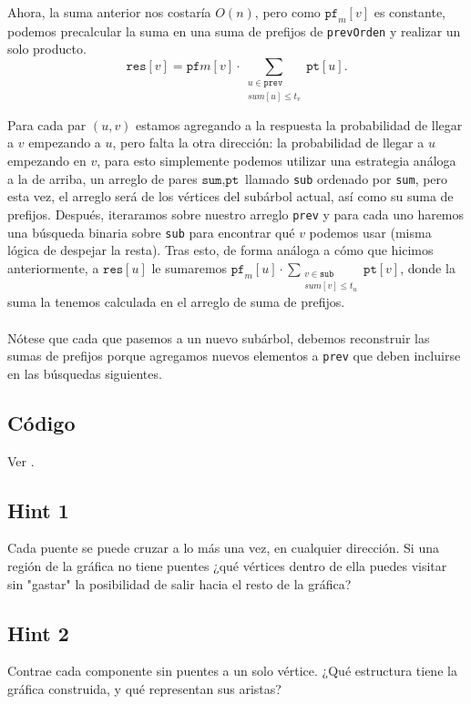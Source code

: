 Ahora, la suma anterior nos costaría $O(n)$, pero como $\texttt{pf}_m[v]$ es constante, podemos precalcular la suma en una suma de prefijos de \texttt{prevOrden} y realizar un solo producto.
\[\texttt{res}[v] =\texttt{pf}m[v] \cdot \sum_{\substack{u \in \texttt{prev} \\ sum[u]\leq t_v}} \texttt{pt}[u].\]

Para cada par $(u,v)$ estamos agregando a la respuesta la probabilidad de llegar a $v$ empezando a $u$, pero falta la otra dirección: la probabilidad de llegar a $u$ empezando en $v$, para esto simplemente podemos utilizar una estrategia análoga a la de arriba, un arreglo de pares ${\texttt{sum}, \texttt{pt}}$ llamado \texttt{sub} ordenado por \texttt{sum}, pero esta vez, el arreglo será de los vértices del subárbol actual, así como su suma de prefijos. Después, iteraramos sobre nuestro arreglo \texttt{prev} y para cada uno haremos una búsqueda binaria sobre \texttt{sub} para encontrar qué $v$ podemos usar (misma lógica de despejar la resta). Tras esto, de forma análoga a cómo que hicimos anteriormente, a $\texttt{res}[u]$ le sumaremos $\texttt{pf}_m[u]\cdot \sum_{\substack{v \in \texttt{sub} \\ sum[v]\leq t_u}} \texttt{pt}[v]$, donde la suma la tenemos calculada en el arreglo de suma de prefijos.
\\\\
Nótese que cada que pasemos a un nuevo subárbol, debemos reconstruir las sumas de prefijos porque agregamos nuevos elementos a \texttt{prev} que deben incluirse en las búsquedas siguientes.
\subsection*{Código}
Ver .


\subsection*{Hint 1}
Cada puente se puede cruzar a lo más una vez, en cualquier dirección. Si una región de la gráfica no tiene puentes ¿qué vértices dentro de ella puedes visitar sin "gastar" la posibilidad de salir hacia el resto de la gráfica?

\subsection*{Hint 2}
Contrae cada componente sin puentes a un solo vértice. ¿Qué estructura tiene la gráfica construida, y qué representan sus aristas?

